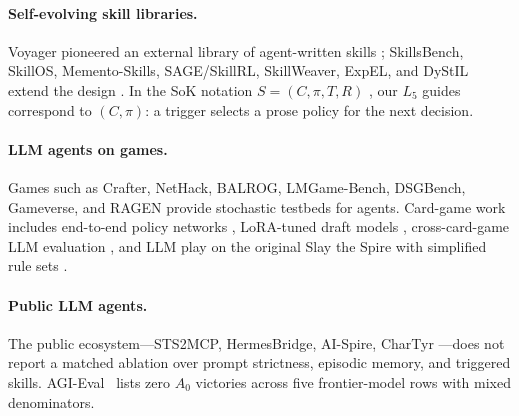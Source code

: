 \paragraph{Self-evolving skill libraries.}
Voyager pioneered an external library of agent-written skills
\citep{voyager2023}; SkillsBench, SkillOS, Memento-Skills,
SAGE/SkillRL, SkillWeaver, ExpEL, and DyStIL extend the design
\citep{skillsbench2026,skillos2026,memento-skills-2026,%
sage-skillrl-2025,skillweaver2025,expel2024,dystil2025}. In the
SoK notation $S=(C,\pi,T,R)$ \citep{sok-agentic-skills-2026}, our
$L_5$ guides correspond to $(C,\pi)$: a trigger selects a prose
policy for the next decision.

\paragraph{LLM agents on games.}
Games such as Crafter, NetHack, BALROG, LMGame-Bench, DSGBench,
Gameverse, and RAGEN \citep{crafter2022,nethack2020,balrog2024,lmgame-bench-2025,%
dsgbench-2025,gameverse2026,ragen2025} provide stochastic testbeds
for agents. Card-game work includes end-to-end policy networks
\citep{xiao-hearthstone-2023}, LoRA-tuned draft models
\citep{urzagpt-2025}, cross-card-game LLM evaluation
\citep{wang-cardgames-2025}, and LLM play on the original Slay the
Spire with simplified rule sets
\citep{bateni-whitehead-2024,rethinking-agent-design-2025}.

\paragraph{Public \stspad{} LLM agents.}
The public \stspad{} ecosystem---STS2MCP, HermesBridge, AI-Spire,
CharTyr \citep{sts2mcp-2026,hermesbridge-2026,ai-spire-2026,%
chartyr-sts2-2026}---does not report a matched ablation over
prompt strictness, episodic memory, and triggered skills.
AGI-Eval~\cite{agi-eval-spire-2026} lists zero $A_0$ victories across
five frontier-model rows with mixed denominators.

